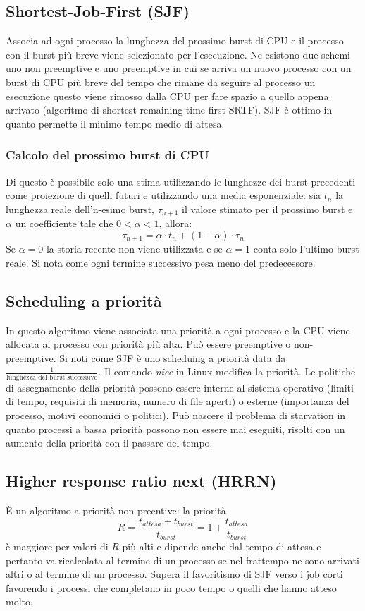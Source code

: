 \subsection{Shortest-Job-First (SJF)}
Associa ad ogni processo la lunghezza del prossimo burst di CPU e il processo con il burst pi\`u breve viene selezionato per l'esecuzione. Ne esistono due schemi uno non preemptive e uno
preemptive in cui se arriva un nuovo processo con un burst di CPU pi\`u breve del tempo che rimane da seguire al processo un esecuzione questo viene rimosso dalla CPU per fare spazio
a quello appena arrivato (algoritmo di shortest-remaining-time-first SRTF). SJF \`e ottimo in quanto permette il minimo tempo medio di attesa. 
\subsubsection{Calcolo del prossimo burst di CPU}
Di questo \`e possibile solo una stima utilizzando le lunghezze dei burst precedenti come proiezione di quelli futuri e utilizzando una media esponenziale: sia $t_n$ la lunghezza reale
dell'n-esimo burst, $\tau_{n+1}$ il valore stimato per il prossimo burst e $\alpha$ un coefficiente tale che $0<\alpha<1$, allora: 
$$\tau_{n+1} = \alpha\cdot t_n + (1-\alpha)\cdot \tau_n$$
Se $\alpha = 0$ la storia recente non viene utilizzata e se $\alpha = 1$ conta solo l'ultimo burst reale. Si nota come ogni termine successivo pesa meno del predecessore.
\subsection{Scheduling a priorit\`a}
In questo algoritmo viene associata una priorit\`a a ogni processo e la CPU viene allocata al processo con priorit\`a pi\`u alta. Pu\`o essere preemptive o non-preemptive. Si noti
come SJF \`e uno scheduing a priorit\`a data da $\frac{1}{\text{lunghezza del burst successivo}}$. Il comando \emph{nice} in Linux modifica la priorit\`a. Le politiche di assegnamento
della priorit\`a possono essere interne al sistema operativo (limiti di tempo, requisiti di memoria, numero di file aperti) o esterne (importanza del processo, motivi economici o 
politici). Pu\`o nascere il problema di starvation in quanto processi a bassa priorit\`a possono non essere mai eseguiti, risolti con un aumento della priorit\`a con il passare del
tempo. 
\subsection{Higher response ratio next (HRRN)}
\`E un algoritmo a priorit\`a non-preentive: la priorit\`a $$R=\frac{t_{attesa} + t_{burst}}{t_{burst}} = 1 + \frac{t_{attesa}}{t_{burst}}$$ \`e maggiore per valori di $R$ pi\`u alti e
dipende anche dal tempo di attesa e pertanto va ricalcolata al termine di un processo se nel frattempo ne sono arrivati altri o al termine di un processo. Supera il favoritismo di SJF
verso i job corti favorendo i processi che completano in poco tempo o quelli che hanno atteso molto. 
